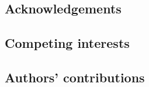 \documentclass[
  super,
  preprint,
  3p]{elsarticle}
\begin{document}
\hypertarget{acknowledgements}{%
\subsection*{Acknowledgements}\label{acknowledgements}}

\hypertarget{competing-interests}{%
\subsection*{Competing interests}\label{competing-interests}}

\hypertarget{authors-contributions}{%
\subsection*{Authors' contributions}\label{authors-contributions}}


  
\end{document}
